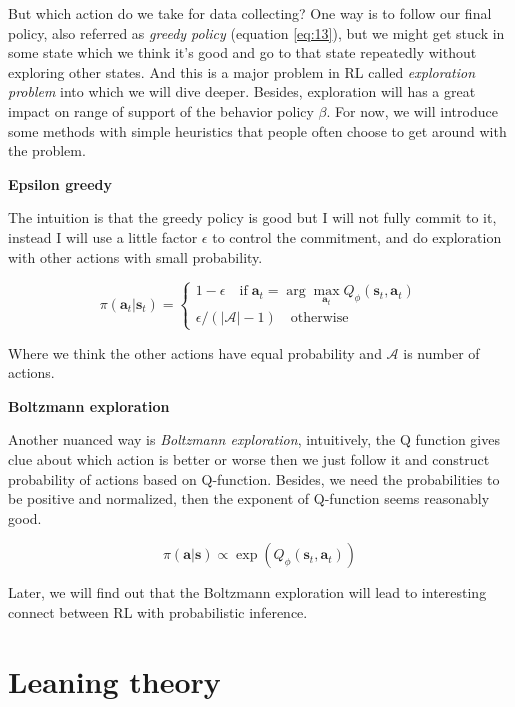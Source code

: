 \documentclass{tufte-handout}
\newcommand{\s}{\mathbf{s}}
\newcommand{\act}{\mathbf{a}}
\begin{document}
But which action do we take for data collecting? One way is to follow our final policy, also referred as \emph{greedy policy} (equation \ref{eq:13}), but we might get stuck in some state which we think it's good and go to that state repeatedly without exploring other states. And this is a major problem in RL called \emph{exploration problem} into which we will dive deeper. Besides, exploration will has a great impact on range of support of the behavior
policy $\beta$. For now, we will introduce some methods with simple heuristics that people often choose to get around with the problem.

\textbf{Epsilon greedy}

The intuition is that the greedy policy is good but I will not fully commit to it, instead I will use a little factor $\epsilon$ to control the commitment, and do exploration with other actions with small probability.

\begin{equation}
\label{eq:14}
\pi(\act_t | \s_t) =
\begin{cases}
1- \epsilon \quad \text{if} \; \act_t = \arg \max_{\act_t} {Q}_\phi(\s_t, \act_t) \\
\epsilon/(|\mathcal{A}| -1) \quad \text{otherwise}
\end{cases}
\end{equation}

Where we think the other actions have equal probability and $\mathcal{A}$ is number of actions.

\textbf{Boltzmann exploration}

Another nuanced way is \emph{Boltzmann exploration}, intuitively, the Q function gives clue about which action is better or worse then we just follow it and construct probability of actions based on Q-function. Besides, we need the probabilities to be positive and normalized, then the exponent of Q-function
seems reasonably good.

\begin{equation}
\label{eq:15}
\pi(\act | \s) \propto \exp( Q_\phi (\s_t, \act_t))
\end{equation}

Later, we will find out that the Boltzmann exploration will lead to interesting connect between RL with probabilistic inference.

\section{Leaning theory}
\end{document}
